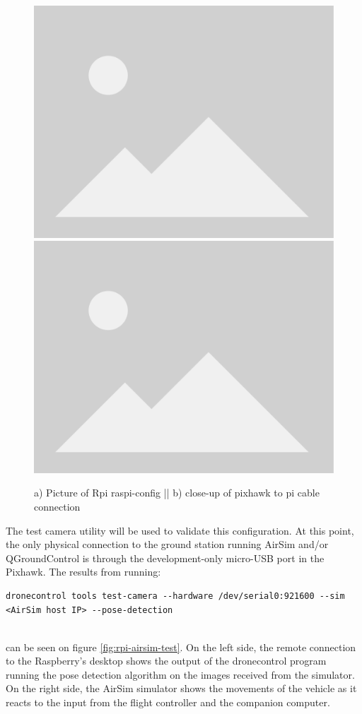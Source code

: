 \begin{figure}
  \centering
  \includegraphics[width=.45\textwidth, keepaspectratio]{img/placeholder.png}
  \includegraphics[width=.45\textwidth, keepaspectratio]{img/placeholder.png}
  \caption{a) Picture of Rpi raspi-config || b) close-up of pixhawk to pi cable connection}
  \label{fig:serial-connection}
\end{figure}

The test camera utility will be used to validate this configuration.
At this point, the only physical connection to the ground station running AirSim and/or QGroundControl is through the development-only micro-USB port in the Pixhawk.
The results from running: \\
\begin{listing}[h!]
    \begin{verbatim}
dronecontrol tools test-camera --hardware /dev/serial0:921600 --sim <AirSim host IP> --pose-detection
    \end{verbatim}
\end{listing}\\
can be seen on figure \ref{fig:rpi-airsim-test}.
On the left side, the remote connection to the Raspberry's desktop shows the output of the dronecontrol program running the pose detection algorithm on the images received from the simulator.
On the right side, the AirSim simulator shows the movements of the vehicle as it reacts to the input from the flight controller and the companion computer.

